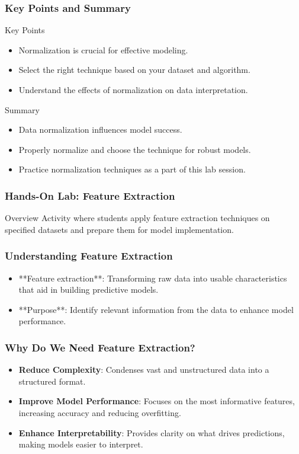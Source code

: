 \documentclass[aspectratio=169]{beamer}
\begin{document}
\begin{frame}[fragile]
    \frametitle{Key Points and Summary}
    \begin{block}{Key Points}
        \begin{itemize}
            \item Normalization is crucial for effective modeling.
            \item Select the right technique based on your dataset and algorithm.
            \item Understand the effects of normalization on data interpretation.
        \end{itemize}
    \end{block}
    \begin{block}{Summary}
        \begin{itemize}
            \item Data normalization influences model success.
            \item Properly normalize and choose the technique for robust models.
            \item Practice normalization techniques as a part of this lab session.
        \end{itemize}
    \end{block}
\end{frame}

\begin{frame}[fragile]
    \frametitle{Hands-On Lab: Feature Extraction}
    \begin{block}{Overview}
        Activity where students apply feature extraction techniques on specified datasets and prepare them for model implementation.
    \end{block}
\end{frame}

\begin{frame}[fragile]
    \frametitle{Understanding Feature Extraction}
    \begin{itemize}
        \item **Feature extraction**: Transforming raw data into usable characteristics that aid in building predictive models.
        \item **Purpose**: Identify relevant information from the data to enhance model performance.
    \end{itemize}
\end{frame}

\begin{frame}[fragile]
    \frametitle{Why Do We Need Feature Extraction?}
    \begin{itemize}
        \item \textbf{Reduce Complexity}: Condenses vast and unstructured data into a structured format.
        \item \textbf{Improve Model Performance}: Focuses on the most informative features, increasing accuracy and reducing overfitting.
        \item \textbf{Enhance Interpretability}: Provides clarity on what drives predictions, making models easier to interpret.
    \end{itemize}
\end{frame}
\end{document}

